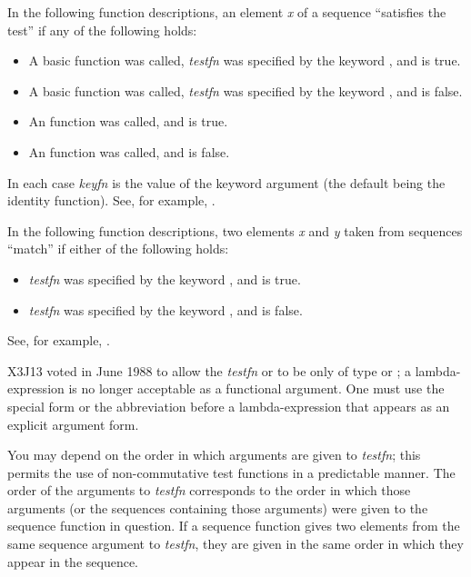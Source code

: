 In the following function descriptions, an element \emph{x} of a sequence
``satisfies the test'' if any of the following holds:
\begin{itemize}
\item
A basic function was called,
\emph{testfn} was specified by the keyword , and
 is true.

\item
A basic function was called,
\emph{testfn} was specified by the keyword , and
 is false.

\item
An  function was called, and
 is true.

\item
An  function was called, and
 is false.
\end{itemize}
In each case \emph{keyfn} is the
value of the  keyword argument (the default being the identity
function).  See, for example, .

In the following function descriptions,
two elements \emph{x} and \emph{y} taken from sequences ``match'' if
either of the following holds:
\begin{itemize}
\item
\emph{testfn} was specified by the keyword , and
 is true.

\item
\emph{testfn} was specified by the keyword , and
 is false.
\end{itemize}
See, for example, .


\begin{newer}
X3J13 voted in June 1988  to allow the \emph{testfn}
or 
to be only of type  or ; a lambda-expression
is no longer acceptable as a functional argument.  One must use the
 special form or the abbreviation  before
a lambda-expression that appears as an  explicit argument form.
\end{newer}

You may depend on the order in which arguments
are given to \emph{testfn}; this permits the use of non-commutative
test functions in a predictable manner.
The order of the arguments to \emph{testfn} corresponds
to the order in which those arguments (or the sequences containing
those arguments)
were given to the sequence function in question.
If a sequence function gives two elements from the same
sequence argument to \emph{testfn}, they are given in the same order in
which they appear in the sequence.


